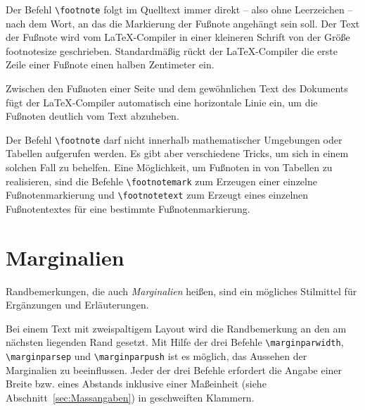 Der Befehl \verb!\footnote! folgt im Quelltext immer direkt -- also ohne
Leerzeichen -- nach dem Wort, an das die Markierung der Fußnote angehängt sein soll. Der
Text der Fußnote wird vom \LaTeX-Compiler in einer kleineren Schrift von der Größe  
{\footnotesize footnotesize} geschrieben. 
Standardmäßig rückt der \LaTeX-Compiler die erste
Zeile einer Fußnote einen halben Zentimeter ein. 

Zwischen den
Fußnoten einer Seite und dem gewöhnlichen 
Text des Dokuments fügt der \LaTeX-Compiler automatisch eine
horizontale Linie ein, um die Fußnoten deutlich vom Text abzuheben. 

Der Befehl \verb!\footnote! darf nicht innerhalb mathematischer 
Umgebungen oder Tabellen aufgerufen werden. Es gibt aber verschiedene Tricks, um sich in einem solchen Fall zu behelfen. Eine Möglichkeit, um Fußnoten in von Tabellen zu realisieren, sind die Befehle \verb!\footnotemark! 
zum Erzeugen einer einzelne Fußnotenmarkierung und \verb!\footnotetext! 
zum Erzeugt eines einzelnen Fußnotentextes für eine bestimmte Fußnotenmarkierung.

\section{Marginalien}

Randbemerkungen, die auch \emph{Marginalien} heißen, 
sind ein mögliches Stilmittel für 
Ergänzungen und Erläuterungen.   


Bei einem Text mit zweispaltigem Layout wird die Randbemerkung an den am 
nächsten liegenden Rand gesetzt.
Mit Hilfe der drei Befehle \verb!\marginparwidth!, 
\verb!\marginparsep! und 
\verb!\marginparpush! ist es möglich, das Aussehen der Marginalien zu beeinflussen.
Jeder der drei Befehle erfordert die Angabe einer Breite bzw. eines Abstands inklusive einer Maßeinheit (siehe Abschnitt~\ref{sec:Massangaben}) in geschweiften Klammern.

